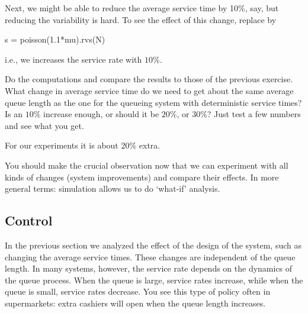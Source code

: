 \begin{exercise}
  Next, we might be able to reduce the average service time by 10\%, say, but reducing the variability is hard. To see the effect of this change, replace  by
  \begin{pyverbatim}
s = poisson(1.1*mu).rvs(N)    
  \end{pyverbatim}
i.e., we increases the service rate with $10\%$. 

Do the computations and compare the results to those of the previous exercise. What change in average service time do we need to get about the same average queue length as the one for the queueing system with deterministic service times? Is an $10\%$ increase enough, or should it be $20\%$, or $30\%$? Just test a few numbers and see what you get. 
  \begin{solution}
For our experiments it is about 20\% extra.
  \end{solution}
\end{exercise}

You should make the crucial observation now that we can experiment with all kinds of changes (system improvements) and compare their effects. In more general terms: simulation allows us to do `what-if' analysis. 

\subsection{Control }
\label{sec:control-}

In the previous section we analyzed the effect of the design of the system, such as changing the average service times. These changes are independent of the queue length. In many systems, however, the service rate depends on the dynamics of the queue process. When the queue is large, service rates increase, while when the queue is small, service rates decrease.  You see this type of policy often in supermarkets: extra cashiers will open when the queue length increases.

